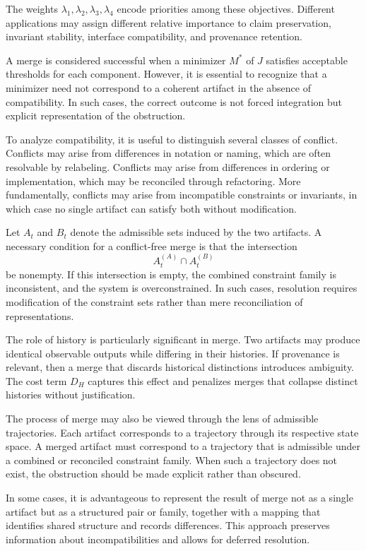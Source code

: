 \documentclass[11pt,oneside]{article}
\begin{document}
The weights \( \lambda_1, \lambda_2, \lambda_3, \lambda_4 \) encode priorities among these objectives. Different applications may assign different relative importance to claim preservation, invariant stability, interface compatibility, and provenance retention.

A merge is considered successful when a minimizer \( M^\ast \) of \( J \) satisfies acceptable thresholds for each component. However, it is essential to recognize that a minimizer need not correspond to a coherent artifact in the absence of compatibility. In such cases, the correct outcome is not forced integration but explicit representation of the obstruction.

To analyze compatibility, it is useful to distinguish several classes of conflict. Conflicts may arise from differences in notation or naming, which are often resolvable by relabeling. Conflicts may arise from differences in ordering or implementation, which may be reconciled through refactoring. More fundamentally, conflicts may arise from incompatible constraints or invariants, in which case no single artifact can satisfy both without modification.

Let \( A_t \) and \( B_t \) denote the admissible sets induced by the two artifacts. A necessary condition for a conflict-free merge is that the intersection
\[
A_t^{(A)} \cap A_t^{(B)}
\]
be nonempty. If this intersection is empty, the combined constraint family is inconsistent, and the system is overconstrained. In such cases, resolution requires modification of the constraint sets rather than mere reconciliation of representations.

The role of history is particularly significant in merge. Two artifacts may produce identical observable outputs while differing in their histories. If provenance is relevant, then a merge that discards historical distinctions introduces ambiguity. The cost term \( D_H \) captures this effect and penalizes merges that collapse distinct histories without justification.

The process of merge may also be viewed through the lens of admissible trajectories. Each artifact corresponds to a trajectory through its respective state space. A merged artifact must correspond to a trajectory that is admissible under a combined or reconciled constraint family. When such a trajectory does not exist, the obstruction should be made explicit rather than obscured.

In some cases, it is advantageous to represent the result of merge not as a single artifact but as a structured pair or family, together with a mapping that identifies shared structure and records differences. This approach preserves information about incompatibilities and allows for deferred resolution.
\end{document}
